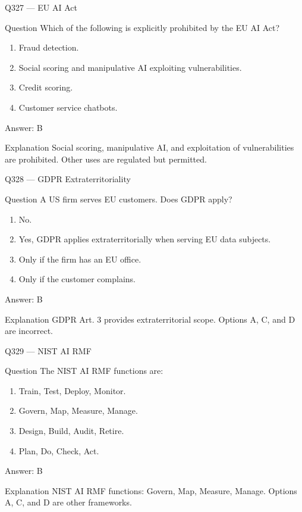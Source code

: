 \documentclass[aspectratio=169,8pt]{beamer}
\begin{document}
\begin{frame}{Q327 --- EU AI Act}
	\begin{block}{Question}
		Which of the following is explicitly prohibited by the EU AI Act?
		\begin{enumerate}
			\item Fraud detection.
			\item Social scoring and manipulative AI exploiting vulnerabilities.
			\item Credit scoring.
			\item Customer service chatbots.
	\end{enumerate}  \end{block}
	\begin{exampleblock}{Answer: B}\end{exampleblock}
	\begin{block}{Explanation}
		Social scoring, manipulative AI, and exploitation of vulnerabilities are prohibited. Other uses are regulated but permitted.
	\end{block}
\end{frame}

\begin{frame}{Q328 --- GDPR Extraterritoriality}
	\begin{block}{Question}
		A US firm serves EU customers. Does GDPR apply?
		\begin{enumerate}
			\item No.
			\item Yes, GDPR applies extraterritorially when serving EU data subjects.
			\item Only if the firm has an EU office.
			\item Only if the customer complains.
	\end{enumerate}  \end{block}
	\begin{exampleblock}{Answer: B}\end{exampleblock}
	\begin{block}{Explanation}
		GDPR Art. 3 provides extraterritorial scope. Options A, C, and D are incorrect.
	\end{block}
\end{frame}

\begin{frame}{Q329 --- NIST AI RMF}
	\begin{block}{Question}
		The NIST AI RMF functions are:
		\begin{enumerate}
			\item Train, Test, Deploy, Monitor.
			\item Govern, Map, Measure, Manage.
			\item Design, Build, Audit, Retire.
			\item Plan, Do, Check, Act.
	\end{enumerate}  \end{block}
	\begin{exampleblock}{Answer: B}\end{exampleblock}
	\begin{block}{Explanation}
		NIST AI RMF functions: Govern, Map, Measure, Manage. Options A, C, and D are other frameworks.
	\end{block}
\end{frame}
\end{document}
